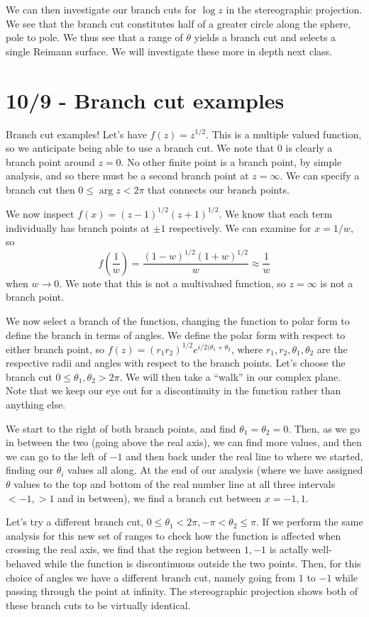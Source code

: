 \documentclass[10pt]{report}
\begin{document}
We can then investigate our branch cuts for $\log z$ in the stereographic projection. We see that the branch cut constitutes half of a greater circle along the sphere, pole to pole. We thus see that a range of $\theta$ yields a branch cut and selects a single Reimann surface. We will investigate these more in depth next class. 

\chapter{10/9 - Branch cut examples}

Branch cut examples! Let's have $f(z)=z^{1/2}$. This is a multiple valued function, so we anticipate being able to use a branch cut. We note that $0$ is clearly a branch point around $z=0$. No other finite point is a branch point, by simple analysis, and so there must be a second branch point at $z=\infty$. We can specify a branch cut then $0\leq \arg z < 2\pi$ that connects our branch points. 

We now inspect $f(x)=(z-1)^{1/2}(z+1)^{1/2}$. We know that each term individually has branch points at $\pm1$ respectively. We can examine for $x=1/w$, so
$$f\left( \frac{1}{w} \right) = \frac{(1-w)^{1/2}(1+w)^{1/2}}{w}\approx\frac{1}{w}$$
when $w \to 0$. We note that this is not a multivalued function, so $z=\infty$ is not a branch point.

We now select a branch of the function, changing the function to polar form to define the branch in terms of angles. We define the polar form with respect to either branch point, so $f(z)=(r_1r_2)^{1/2}e^{i/2(\theta_1+\theta_2}$, where $r_1,r_2,\theta_1,\theta_2$ are the respective radii and angles with respect to the branch points. Let's choose the branch cut $0 \leq \theta_1,\theta_2 > 2\pi$. We will then take a ``walk'' in our complex plane. Note that we keep our eye out for a discontinuity in the function rather than anything else.

We start to the right of both branch points, and find $\theta_1=\theta_2=0$. Then, as we go in between the two (going above the real axis), we can find more values, and then we can go to the left of $-1$ and then back under the real line to where we started, finding our $\theta_i$ values all along. At the end of our analysis (where we have assigned $\theta$ values to the top and bottom of the real number line at all three intervals $<-1,>1$ and in between), we find a branch cut between $x=-1,1$. 

Let's try a different branch cut, $0 \leq \theta_1 < 2\pi, -\pi < \theta_2 \leq \pi$. If we perform the same analysis for this new set of ranges to check how the function is affected when crossing the real axis, we find that the region between $1,-1$ is actally well-behaved while the function is discontinuous outside the two points. Then, for this choice of angles we have a different branch cut, namely going from $1$ to $-1$ while passing through the point at infinity. The stereographic projection shows both of these branch cuts to be virtually identical. 
\end{document}
